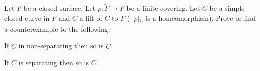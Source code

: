 Let $F$ be a closed surface. Let $p:\tilde{F}\rightarrow F$ be a
finite covering. Let $C$ be a simple closed curve in $F$ and
$\tilde{C}$ a lift of $C$ to $\tilde{F}$ (\ie\ $p|_{\tilde{C}}$ is a
homeomorphism). Prove or find a counterexample to the following:
\begin{alist}
\item If $C$ in non-separating then so is $\tilde{C}$.
\item If $C$ is separating then so is $\tilde{C}$. 
\end{alist}
